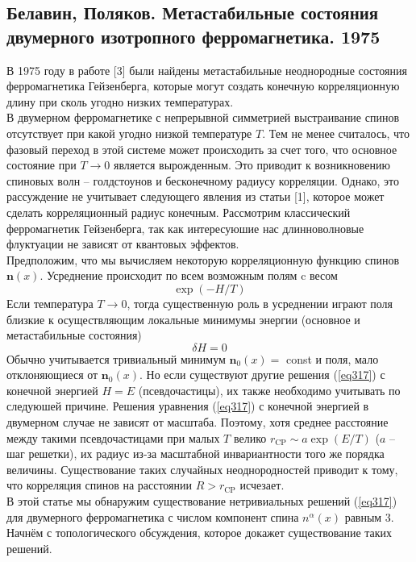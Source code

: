 \documentclass[12pt]{article}
\theoremstyle{definition}
\begin{document}
\subsection{Белавин, Поляков. Метастабильные состояния двумерного изотропного ферромагнетика. 1975}
В 1975 году в работе [3] были найдены метастабильные неоднородные состояния ферромагнетика Гейзенберга, которые могут создать конечную корреляционную длину при сколь угодно низких температурах.\\
В двумерном ферромагнетике с непрерывной симметрией выстраивание спинов отсутствует при какой угодно низкой температуре $T$. Тем не менее считалось, что фазовый переход в этой системе может происходить за счет того, что основное состояние при $T \rightarrow 0$ является вырожденным. Это приводит к возникновению спиновых волн -- голдстоунов и бесконечному радиусу корреляции. Однако, это рассуждение не учитывает следующего явления из статьи [1], которое может сделать корреляционный радиус конечным. Рассмотрим классический ферромагнетик Гейзенберга, так как интересуюшие нас длинноволновые флуктуации не зависят от квантовых эффектов.\\
Предположим, что мы вычисляем некоторую корреляционную функцию спинов $\mathbf{n}(x)$. Усреднение происходит по всем возможным полям c весом
\begin{equation}
    \exp (-H/T)
\end{equation}
Если температура $T \rightarrow 0$, тогда существенную роль в усреднении играют поля близкие к осуществляющим локальные минимумы энергии (основное и метастабильные состояния)
\begin{equation}\label{eq317}
    \delta H=0
\end{equation}
Обычно учитывается тривиальный минимум $\bm{n}_0(x)=$ const и поля, мало отклоняющиеся от $\bm{n}_0(x)$. Но если существуют другие решения (\ref{eq317}) с конечной энергией $H=E$ (псевдочастицы), их также необходимо учитывать по следуюшей причине. Решения уравнения (\ref{eq317}) с конечной энергией в двумерном случае не зависят от масштаба. Поэтому, хотя среднее расстояние между такими псевдочастицами при малых $T$ велико $r_\text{CP}\sim a\exp(E/T)$ ($a$ -- шаг решетки), их радиус из-за масштабной инвариантности того же порядка величины. Существование таких случайных неоднородностей приводит к тому, что корреляция спинов на расстоянии $R>r_{\text{CP}}$ исчезает.\\
В этой статье мы обнаружим существование нетривиальных решений (\ref{eq317}) для двумерного ферромагнетика с числом компонент спина $n^\alpha(x)$ равным 3. Начнём с топологического обсуждения, которое докажет существование таких решений.\\
\end{document}
